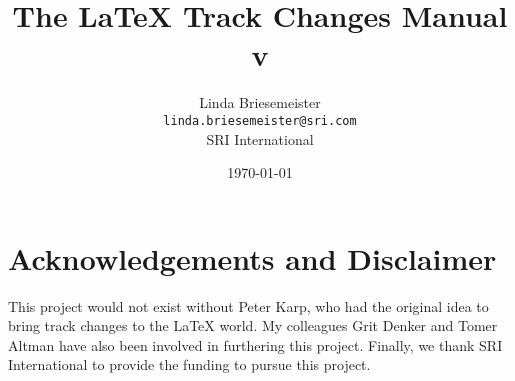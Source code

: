 \documentclass[twoside]{report}
\title{The \LaTeX{} Track Changes Manual \\ {\large v\version}}
\author{%
Linda Briesemeister\\
\texttt{linda.briesemeister@sri.com}\\
SRI International
}
\date{\today}
\begin{document}
\maketitle
{\pagestyle{empty}\cleardoublepage} %

\tableofcontents

\chapter*{Acknowledgements and Disclaimer}

This project would not exist without Peter Karp, who had the original idea to bring track changes to the LaTeX world.  My colleagues Grit Denker and Tomer Altman have also been involved in furthering this project.  Finally, we thank SRI International to provide the funding to pursue this project.










%


\end{document}

